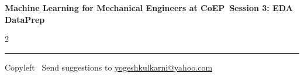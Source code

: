 \documentclass[8pt,landscape]{article}
\begin{document}
\footnotesize

\begin{center}
\Large{\textbf{Machine Learning for Mechanical Engineers at CoEP\ Session 3: EDA DataPrep}}
\end{center}

\begin{multicols}{2}

\end{multicols}

\rule{\linewidth}{0.25pt}
\scriptsize
Copyleft \textcopyleft\  Send suggestions to
\href{http://www.yogeshkulkarni.com}{yogeshkulkarni@yahoo.com}
\end{document}
